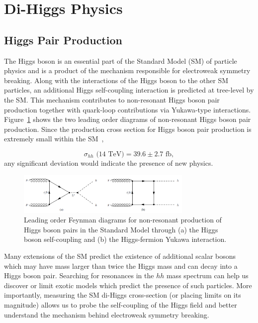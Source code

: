 \section{Di-Higgs Physics}
\subsection{Higgs Pair Production}
\label{sec:physics}

The Higgs boson is an essential part of the Standard Model (SM) of particle physics and is a product of the mechanism responsible for electroweak symmetry breaking. Along with the interactions of the Higgs boson to the other SM particles, an additional Higgs self-coupling interaction is predicted at tree-level by the SM. This mechanism contributes to non-resonant Higgs boson pair production together with quark-loop contributions via Yukawa-type interactions. Figure~\ref{fig:nr_hh_production} shows the two leading order diagrams of non-resonant Higgs boson pair production. Since the production cross section for Higgs boson pair production is extremely small within the SM~\cite{deFlorian:2016spz}, 

\begin{equation*}
\sigma_{hh}\text{ (14 TeV)} = 39.6 \pm 2.7 \text{ fb},
\end{equation*}
any significant deviation would indicate the presence of new physics.

\begin{figure}[!h] 
\begin{center}
\includegraphics*[width=0.75\textwidth] {dihiggsPhys/figures/nr-diHiggs-production.png}
\caption{Leading order Feynman diagrams for non-resonant production of Higgs
  boson pairs in the Standard Model through (a) the Higgs boson self-coupling
  and (b) the Higgs-fermion Yukawa interaction.} 
  \label{fig:nr_hh_production}
\end{center}
\end{figure}

Many extensions of the SM predict the existence of additional scalar bosons which may have mass larger than twice the Higgs mass and can decay into a Higgs boson pair. Searching for resonances in the $hh$ mass spectrum can help us discover or limit exotic models which predict the presence of such particles. More importantly, measuring the SM di-Higgs cross-section (or placing limits on its magnitude) allows us to probe the self-coupling of the Higgs field and better understand the mechanism behind electroweak symmetry breaking.

